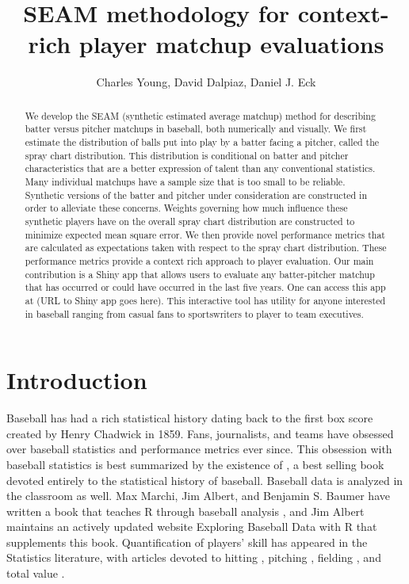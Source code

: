 \documentclass[11pt]{article}
\title{SEAM methodology for context-rich player matchup evaluations}
\author{Charles Young, David Dalpiaz, Daniel J. Eck}
\begin{document}
\maketitle

\begin{abstract}
We develop the SEAM (synthetic estimated average matchup) method for describing batter versus pitcher matchups in baseball, both numerically and visually. We first estimate the distribution of balls put into play by a batter facing a pitcher, called the spray chart distribution. This distribution is conditional on batter and pitcher characteristics that are a better expression of talent than any conventional statistics. Many individual matchups have a sample size that is too small to be reliable. Synthetic versions of the batter and pitcher under consideration are constructed in order to alleviate these concerns. Weights governing how much influence these synthetic players have on the overall spray chart distribution are constructed to minimize expected mean square error. We then provide novel performance metrics that are calculated as expectations taken with respect to the spray chart distribution. These performance metrics provide a context rich approach to player evaluation. Our main contribution is a Shiny app that allows users to evaluate any batter-pitcher matchup that has occurred or could have occurred in the last five years. One can access this app at (URL to Shiny app goes here). This interactive tool has utility for anyone interested in baseball ranging from casual fans to sportswriters to player to team executives.
\end{abstract}



\section{Introduction}

Baseball has had a rich statistical history dating back to the first box score created by Henry Chadwick in 1859. Fans, journalists, and teams have obsessed over baseball statistics and performance metrics ever since. This obsession with baseball statistics is best summarized by the existence of \cite{schwarz2004numbers}, a best selling book devoted entirely to the statistical history of baseball. Baseball data is analyzed in the classroom as well. Max Marchi, Jim Albert, and Benjamin S. Baumer have written a book that teaches R through baseball analysis \citep{marchi2019analyzing}, and Jim Albert maintains an actively updated website Exploring Baseball Data with R that supplements this book. 
Quantification of players' skill has appeared in the Statistics literature, with articles devoted to
hitting \citep{berry1999bridging, albert2008streaky, brown2008season, jensen2009hierarchical},
pitching \citep{albert2006pitching, shinya2017pitching},
fielding \citep{jensen2009bayesball, piette2012estimating}, 
and total value \citep{baumer2015openwar}.
\end{document}
